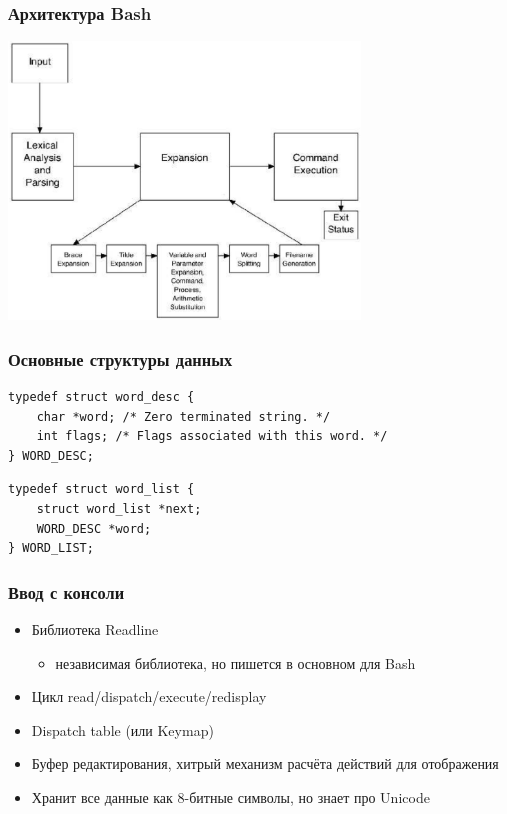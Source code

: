 \documentclass[xetex,mathserif,serif]{beamer}
\begin{document}
	\begin{frame}
		\frametitle{Архитектура Bash}
		\begin{center}
			\includegraphics[width=0.7\textwidth]{bashArchitecture.png}
		\end{center}
	\end{frame}

	\begin{frame}[fragile]
		\frametitle{Основные структуры данных}
		\begin{verbatim}
typedef struct word_desc {
    char *word; /* Zero terminated string. */
    int flags; /* Flags associated with this word. */
} WORD_DESC;
		\end{verbatim}

		\vspace{3mm}

		\begin{verbatim}
typedef struct word_list {
    struct word_list *next;
    WORD_DESC *word;
} WORD_LIST;
		\end{verbatim}
	\end{frame}

	\begin{frame}
		\frametitle{Ввод с консоли}
		\begin{itemize}
			\item Библиотека Readline
			\begin{itemize}
				\item независимая библиотека, но пишется в основном для Bash
			\end{itemize}
			\item Цикл read/dispatch/execute/redisplay
			\item Dispatch table (или Keymap)
			\item Буфер редактирования, хитрый механизм расчёта действий для отображения
			\item Хранит все данные как 8-битные символы, но знает про Unicode
		\end{itemize}
	\end{frame}
\end{document}
